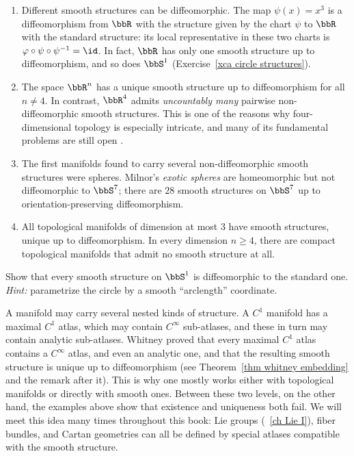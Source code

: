 \begin{example}
    \begin{enumerate}
        \item Different smooth structures can be diffeomorphic. The map $\psi(x)=x^3$ is a diffeomorphism from $\bbR$ with the structure given by the chart $\psi$ to $\bbR$ with the standard structure: its local representative in these two charts is $\varphi\circ\psi\circ\psi^{-1}=\id$. In fact, $\bbR$ has only one smooth structure up to diffeomorphism, and so does $\bbS^1$ (Exercise~\ref{xca circle structures}).
        \item The space $\bbR^n$ has a unique smooth structure up to diffeomorphism for all $n\neq4$. In contrast, $\bbR^4$ admits \emph{uncountably many} pairwise non-diffeomorphic smooth structures. This is one of the reasons why four-dimensional topology is especially intricate, and many of its fundamental problems are still open \cite{smooth.structures}.
        \item The first manifolds found to carry several non-diffeomorphic smooth structures were spheres. Milnor's \emph{exotic spheres} are homeomorphic but not diffeomorphic to $\bbS^7$; there are $28$ smooth structures on $\bbS^7$ up to orientation-preserving diffeomorphism.
        \item All topological manifolds of dimension at most $3$ have smooth structures, unique up to diffeomorphism. In every dimension $n\geq4$, there are compact topological manifolds that admit no smooth structure at all.
    \end{enumerate}
\end{example}

\begin{xca}\label{xca circle structures}
    Show that every smooth structure on $\bbS^1$ is diffeomorphic to the standard one. \emph{Hint:} parametrize the circle by a smooth ``arclength'' coordinate.
\end{xca}

\begin{rem}
    A manifold may carry several nested kinds of structure. A $C^1$ manifold has a maximal $C^1$ atlas, which may contain $C^\infty$ sub-atlases, and these in turn may contain analytic sub-atlases. Whitney proved that every maximal $C^1$ atlas contains a $C^\infty$ atlas, and even an analytic one, and that the resulting smooth structure is unique up to diffeomorphism (see Theorem~\ref{thm whitney embedding} and the remark after it). This is why one mostly works either with topological manifolds or directly with smooth ones. Between these two levels, on the other hand, the examples above show that existence and uniqueness both fail. We will meet this idea many times throughout this book: Lie groups (\Chap~\ref{ch Lie I}), fiber bundles, and Cartan geometries can all be defined by special atlases compatible with the smooth structure.
\end{rem}


